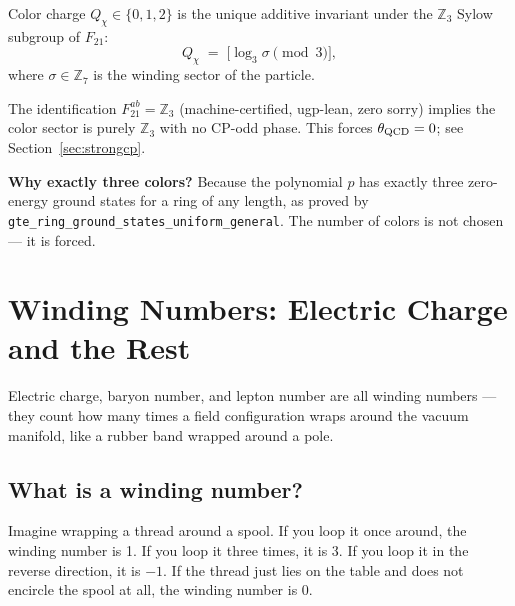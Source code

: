 \documentclass[11pt,a4paper]{article}
\newcommand{\lean}[1]{\texttt{#1}}
\newcommand{\ZS}{\mathbb{Z}_7}
\begin{document}
\begin{tcolorbox}[colback=boxgreen,colframe=green!50!black,
  title={Color charge from the Frobenius group (machine-certified)}]
Color charge $Q_\chi \in \{0,1,2\}$ is the unique additive invariant under
the $\mathbb{Z}_3$ Sylow subgroup of $F_{21}$:
\[
  Q_\chi \;=\; \bigl[\log_3 \sigma \pmod{3}\bigr],
\]
where $\sigma \in \ZS$ is the winding sector of the particle.

The identification $F_{21}^{ab} = \mathbb{Z}_3$ (machine-certified,
ugp-lean, zero sorry) implies the color sector is purely $\mathbb{Z}_3$
with no CP-odd phase.  This forces $\theta_{\rm QCD} = 0$; see
Section~\ref{sec:strongcp}.
\end{tcolorbox}

\noindent
\textbf{Why exactly three colors?}
Because the polynomial $p$ has exactly three zero-energy ground states for
a ring of any length, as proved by
\lean{gte\_ring\_ground\_states\_uniform\_general}.
The number of colors is not chosen --- it is forced.

\section{Winding Numbers: Electric Charge and the Rest}
\label{sec:winding}

\begin{tcolorbox}[colback=boxblue,colframe=blue!40!black,title=Key idea]
Electric charge, baryon number, and lepton number are all winding numbers
--- they count how many times a field configuration wraps around the vacuum
manifold, like a rubber band wrapped around a pole.
\end{tcolorbox}

\subsection{What is a winding number?}

Imagine wrapping a thread around a spool.  If you loop it once around, the
winding number is 1.  If you loop it three times, it is 3.  If you loop it
in the reverse direction, it is $-1$.  If the thread just lies on the table
and does not encircle the spool at all, the winding number is 0.
\end{document}
